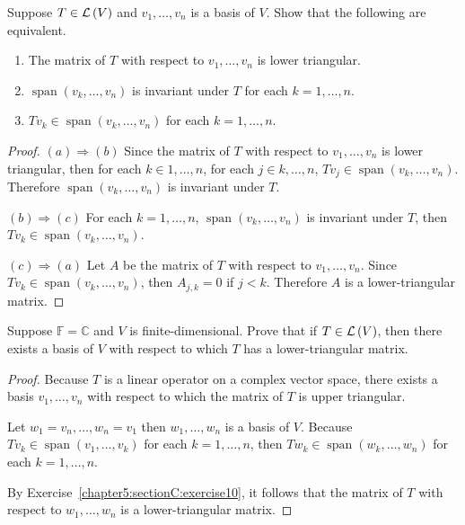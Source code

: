 \begin{exercise}\label{chapter5:sectionC:exercise10}
    Suppose $T\in\mathcal{L}\left({V}\right)$ and $v_{1}, \ldots, v_{n}$ is a basis of $V$. Show that the following are equivalent.
    \begin{enumerate}[label={(\alph*)}]
        \item The matrix of $T$ with respect to $v_{1}, \ldots, v_{n}$ is lower triangular.
        \item $\operatorname{span}(v_{k}, \ldots, v_{n})$ is invariant under $T$ for each $k = 1, \ldots, n$.
        \item $Tv_{k}\in \operatorname{span}(v_{k}, \ldots, v_{n})$ for each $k = 1, \ldots, n$.
    \end{enumerate}
\end{exercise}

\begin{proof}
    $(a) \Rightarrow (b)$ Since the matrix of $T$ with respect to $v_{1}, \ldots, v_{n}$ is lower triangular, then for each $k\in 1,\ldots, n$, for each $j\in k,\ldots, n$, $Tv_{j}\in \operatorname{span}(v_{k}, \ldots, v_{n})$. Therefore $\operatorname{span}(v_{k}, \ldots, v_{n})$ is invariant under $T$.

    $(b) \Rightarrow (c)$ For each $k = 1,\ldots, n$, $\operatorname{span}(v_{k}, \ldots, v_{n})$ is invariant under $T$, then $Tv_{k}\in \operatorname{span}(v_{k}, \ldots, v_{n})$.

    $(c) \Rightarrow (a)$ Let $A$ be the matrix of $T$ with respect to $v_{1}, \ldots, v_{n}$. Since $Tv_{k}\in \operatorname{span}(v_{k}, \ldots, v_{n})$, then $A_{j,k} = 0$ if $j < k$. Therefore $A$ is a lower-triangular matrix.
\end{proof}
\newpage

\begin{exercise}
    Suppose $\mathbb{F} = \mathbb{C}$ and $V$ is finite-dimensional. Prove that if $T\in\mathcal{L}\left({V}\right)$, then there exists a basis of $V$ with respect to which $T$ has a lower-triangular matrix.
\end{exercise}

\begin{proof}
    Because $T$ is a linear operator on a complex vector space, there exists a basis $v_{1}, \ldots, v_{n}$ with respect to which the matrix of $T$ is upper triangular.

    Let $w_{1} = v_{n}, \ldots, w_{n} = v_{1}$ then $w_{1}, \ldots, w_{n}$ is a basis of $V$. Because $Tv_{k}\in \operatorname{span}(v_{1}, \ldots, v_{k})$ for each $k = 1,\ldots, n$, then $Tw_{k}\in \operatorname{span}(w_{k}, \ldots, w_{n})$ for each $k = 1,\ldots, n$.

    By Exercise~\ref{chapter5:sectionC:exercise10}, it follows that the matrix of $T$ with respect to $w_{1}, \ldots, w_{n}$ is a lower-triangular matrix.
\end{proof}
\newpage

